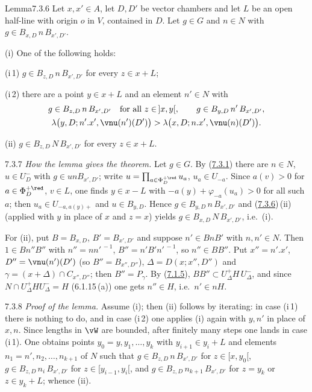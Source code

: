 \documentclass[12pt,a4paper,oneside,english]{smfart}
\makeatletter
\newcommand{\btanchor}[1]{\leavevmode\Hy@raisedlink{\hypertarget{bt:#1}{}}}
\newcommand{\btref}[1]{\hyperlink{bt:#1}{#1}}
\theoremstyle{definition}
\theoremstyle{bt}
\makeatother
\begin{document}
\begin{stmt}{Lemma}{7.3.6}\btanchor{7.3.6}
Let $x,x'\in A$, let $D,D'$ be vector chambers and let $L$ be an open half-line with
origin $o$ in $V$, contained in $D$. Let $g\in G$ and $n\in N$ with
$g\in B_{x,D}\,n\,B_{x',D'}$.

(i) One of the following holds:

\smallskip
\noindent\textup{(i\,1)} $g\in B_{z,D}\,n\,B_{x',D'}$ for every $z\in x+L$;

\smallskip
\noindent\textup{(i\,2)} there are a point $y\in x+L$ and an element $n'\in N$ with
\begin{gather*}
  g\in B_{z,D}\,n\,B_{x',D'}\quad\text{for all }z\in\,]x,y[,\qquad
  g\in B_{y,D}\,n'\,B_{x',D'},\\
  \lambda\bigl(y,D;n'.x',\vnu(n')(D')\bigr)>\lambda\bigl(x,D;n.x',\vnu(n)(D')\bigr).
\end{gather*}

(ii) $g\in B_{z,D}\,N\,B_{x',D'}$ for every $z\in x+L$.
\end{stmt}

\num{7.3.7}\btanchor{7.3.7} \emph{How the lemma gives the theorem.} Let $g\in G$. By (\btref{7.3.1}) there
are $n\in N$, $u\in U_D^{-}$ with $g\in unB_{x',D'}$; write
$u=\prod_{a\in\Phi_D^{+\red}}u_a$, $u_a\in U_{-a}$. Since $a(v)>0$ for
$a\in\Phi_D^{+\red}$, $v\in L$, one finds $y\in x-L$ with
$-a(y)+\varphi_{-a}(u_a)>0$ for all such $a$; then $u_a\in U_{-a,a(y)+}$ and
$u\in B_{y,D}$. Hence $g\in B_{y,D}\,n\,B_{x',D'}$ and (\btref{7.3.6})\,(ii) (applied with
$y$ in place of $x$ and $z=x$) yields $g\in B_{x,D}\,N\,B_{x',D'}$, i.e.\ (i).

For (ii), put $B=B_{x,D}$, $B'=B_{x',D'}$ and suppose $n'\in BnB'$ with $n,n'\in N$.
Then $1\in Bn''B''$ with $n''=nn'^{\,-1}$, $B''=n'B'n'^{\,-1}$, so $n''\in BB''$.
Put $x''=n'.x'$, $D''=\vnu(n')(D')$ (so $B''=B_{x'',D''}$),
$\Delta=D(x;x'',D'')$ and $\gamma=(x+\Delta)\cap C_{x'',D''}$; then $B''=P_\gamma$.
By (\btref{7.1.5}), $BB''\subset U_\Delta^{+}H\,U_\Delta^{-}$, and since
$N\cap U_\Delta^{+}HU_\Delta^{-}=H$ (6.1.15\,(a)) one gets $n''\in H$, i.e.\
$n'\in nH$.

\num{7.3.8}\btanchor{7.3.8} \emph{Proof of the lemma.} Assume (i); then (ii) follows by iterating:
in case (i\,1) there is nothing to do, and in case (i\,2) one applies (i) again with
$y,n'$ in place of $x,n$. Since lengths in $\vW$ are bounded, after finitely many
steps one lands in case (i\,1). One obtains points $y_0=y,y_1,\dots,y_k$ with
$y_{i+1}\in y_i+L$ and elements $n_1=n',n_2,\dots,n_{k+1}$ of $N$ such that
$g\in B_{z,D}\,n\,B_{x',D'}$ for $z\in[x,y_0[$, $g\in B_{z,D}\,n_i\,B_{x',D'}$ for
$z\in[y_{i-1},y_i[$, and $g\in B_{z,D}\,n_{k+1}\,B_{x',D'}$ for $z=y_k$ or
$z\in y_k+L$; whence (ii).
\end{document}
